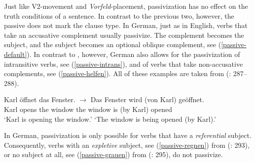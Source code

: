 \documentclass[output=paper]{langsci/langscibook}
\begin{document}
Just like V2-movement and \textit{Vorfeld}-placement, passivization has no effect on the truth conditions of a sentence. In contrast to the previous two, however, the passive does not mark the clause type. In German, just as in English, verbs that take an accusative complement usually passivize. The complement becomes the subject, and the subject becomes an optional oblique complement, see (\ref{passive-default}). In contrast to , however,  German also allows for the passivization of intransitive verbs, see (\ref{passive-intrans}), and of verbs that take non-accusative complements, see (\ref{passive-helfen}). All of these examples are taken from \citeauthor{Mueller:13} (\citeyear{Mueller:13}: 287--288).

\ea
\gll Karl \"offnet das Fenster. {\qquad $\longrightarrow$ } Das Fenster wird (von Karl) ge\"offnet.\\
Karl opens the window {} the window is (by Karl) opened\\
\glt `Karl is opening the window.' {\hfill} `The window is being opened (by Karl).' \label{passive-default}
\z

\begin{exe}
\ex
\begin{xlist}
\end{xlist}
\end{exe}

In   German, passivization is only possible for verbs that have a \textit{referential} subject. Consequently, verbs with an  \textit{expletive} subject, see (\ref{passive-regnen}) from \citeauthor{Mueller:13} (\citeyear{Mueller:13}: 293), or no subject at all, see (\ref{passive-grauen}) from \citeauthor{Mueller:13} (\citeyear{Mueller:13}: 295), do not passivize.

\begin{exe}
\end{exe}

\begin{exe}
\ex\label{passive-grauen}
\begin{xlist}
\end{xlist}
\end{exe}
\end{document}

